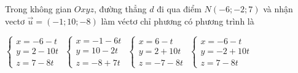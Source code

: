 \documentclass[12pt,a4paper]{article}
\begin{document}
\begin{ex}
 Trong không gian ${Oxyz}$, đường thẳng ${d}$ đi qua điểm ${N(-6;-2;7)}$ và nhận vectơ $\vec{u}=(-1;10;-8)$ làm véctơ chỉ phương có phương trình là
 
\choice
{ $\left\{ \begin{array}{l}x = -6-t\\ y = 2-10t\\z = 7-8t\end{array} \right.$ }
   { $\left\{ \begin{array}{l}x = -1-6t\\ y = 10-2t\\z = -8+7t\end{array} \right.$ }
     { $\left\{ \begin{array}{l}x = 6-t\\ y = 2+10t\\z = -7-8t\end{array} \right.$ }
    { \True $\left\{ \begin{array}{l}x = -6-t\\ y = -2+10t\\z = 7-8t\end{array} \right.$ }
\end{ex}
\end{document}

